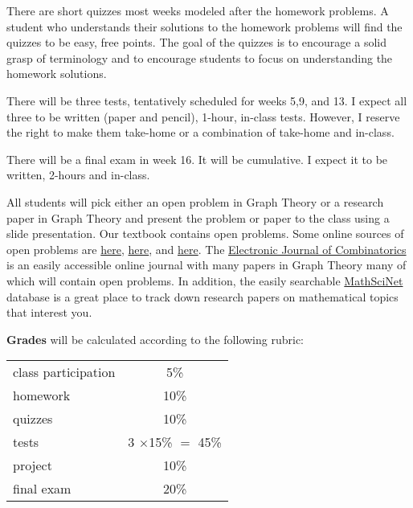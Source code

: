 \documentclass[11pt]{article}
\begin{document}
There are short quizzes most weeks modeled after the homework problems. A student who understands their solutions to the homework problems will find the quizzes to be easy, free points. The goal of the quizzes is to encourage a solid grasp of terminology and to encourage students to focus on understanding the homework solutions.\\

{}

There will be three tests, tentatively scheduled for weeks 5,9, and 13. I expect all three to be written (paper and pencil), 1-hour, in-class tests. However, I reserve the right to make them take-home or a combination of take-home and in-class.

There will be a final exam in week 16. It will be cumulative. I expect it to be written, 2-hours and in-class. \\

{}

All students will pick either an open problem in Graph Theory or a research paper in Graph Theory and present the problem or paper to the class using a slide presentation. Our textbook contains open problems. Some online sources of open problems are \href{http://www.openproblemgarden.org/category/graph_theory}{here}, \href{https://faculty.math.illinois.edu/~west/openp/}{here}, and \href{http://dimacs.rutgers.edu/~hochberg/undopen/graphtheory/graphtheory.html}{here}. The \href{https://www.combinatorics.org/}{Electronic Journal of Combinatorics} is an easily accessible online journal with many papers in Graph Theory many of which will contain open problems. In addition, the easily searchable  \href{https://mathscinet.ams.org/mathscinet}{MathSciNet} database is a great place to track down research papers on mathematical topics that interest you.

\textbf{Grades} will be calculated according to the following rubric:

\begin{tabular}{|l|c|}
  \hline
  class participation & 5\%\\
  homework & 10\% \\
  quizzes&10\%\\
  tests & 3 $\times$15\% $=$ 45\%\\
  project & 10\%\\
  final exam & 20\% \\
  \hline
\end{tabular}
\end{document}
